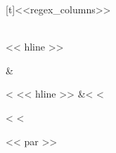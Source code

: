 \documentclass[letterpaper,10pt,english]{sphinxmanual}
\begin{document}
\begin{fulllineitems}
\begin{savenotes}
\begin{tabulary}{\linewidth}[t]{<<regex_columns>>}
\begin{varwidth}[t]{}
\end{varwidth}%
\\
<< hline >>\begin{varwidth}[t]{}
\sphinxstyletheadfamily {}
\sphinxbeforeendvarwidth
\end{varwidth}%
&\begin{varwidth}[t]{}<%
<< hline >>\sphinxstyletheadfamily
{}
&<%
<%
\end{varwidth}%
<%
<%
\end{tabulary}
<< par >>
\sphinxattableend\end{savenotes}

\end{fulllineitems}


\vspace{5px}
\end{document}
